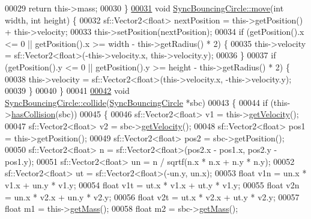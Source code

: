 \begin{DoxyCode}
00029     \textcolor{keywordflow}{return} this->mass;
00030 \}
\hypertarget{_sync_bouncing_circle_8cpp_source_l00031}{}\hyperlink{class_sync_bouncing_circle_a6c3d0788f0efb17e457f1a7d9500643b}{00031} \textcolor{keywordtype}{void} \hyperlink{class_sync_bouncing_circle_a6c3d0788f0efb17e457f1a7d9500643b}{SyncBouncingCircle::move}(\textcolor{keywordtype}{int} width, \textcolor{keywordtype}{int} height) \{
00032     sf::Vector2<float> nextPosition = this->getPosition() + this->velocity;
00033     this->setPosition(nextPosition);
00034     \textcolor{keywordflow}{if} (getPosition().x <= 0 || getPosition().x >= width - this->getRadius() * 2) \{
00035         this->velocity = sf::Vector2<float>(-this->velocity.x, this->velocity.y);
00036     \}
00037     \textcolor{keywordflow}{if} (getPosition().y <= 0 || getPosition().y >= height - this->getRadius() * 2) \{
00038         this->velocity = sf::Vector2<float>(this->velocity.x, -this->velocity.y);
00039     \}
00040 \}
00041 
\hypertarget{_sync_bouncing_circle_8cpp_source_l00042}{}\hyperlink{class_sync_bouncing_circle_a30bf8948d5c62d34d9f403228571886b}{00042} \textcolor{keywordtype}{void} \hyperlink{class_sync_bouncing_circle_a30bf8948d5c62d34d9f403228571886b}{SyncBouncingCircle::collide}(\hyperlink{class_sync_bouncing_circle}{SyncBouncingCircle} *sbc)
00043 \{
00044     \textcolor{keywordflow}{if} (this->\hyperlink{class_sync_bouncing_circle_ab4c66394f5604d08cc1c1738f33376b5}{hasCollision}(sbc))
00045     \{
00046         sf::Vector2<float> v1 = this->\hyperlink{class_sync_bouncing_circle_a53ee06bdeb5025dfd42a49c385e5a1c0}{getVelocity}();
00047         sf::Vector2<float> v2 = sbc->\hyperlink{class_sync_bouncing_circle_a53ee06bdeb5025dfd42a49c385e5a1c0}{getVelocity}();
00048         sf::Vector2<float> pos1 = this->getPosition();
00049         sf::Vector2<float> pos2 = sbc->getPosition();
00050         sf::Vector2<float> n = sf::Vector2<float>(pos2.x - pos1.x, pos2.y - pos1.y);
00051         sf::Vector2<float> un = n / sqrtf(n.x * n.x + n.y * n.y);
00052         sf::Vector2<float> ut = sf::Vector2<float>(-un.y, un.x);
00053         \textcolor{keywordtype}{float} v1n = un.x * v1.x + un.y * v1.y;
00054         \textcolor{keywordtype}{float} v1t = ut.x * v1.x + ut.y * v1.y;
00055         \textcolor{keywordtype}{float} v2n = un.x * v2.x + un.y * v2.y;
00056         \textcolor{keywordtype}{float} v2t = ut.x * v2.x + ut.y * v2.y;
00057         \textcolor{keywordtype}{float} m1 = this->\hyperlink{class_sync_bouncing_circle_ae9682f881b9bcb70450ae6546f3f28a3}{getMass}();
00058         \textcolor{keywordtype}{float} m2 = sbc->\hyperlink{class_sync_bouncing_circle_ae9682f881b9bcb70450ae6546f3f28a3}{getMass}();

\end{DoxyCode}
